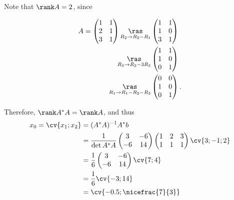\documentclass[11pt]{scrartcl}
\begin{document}
\begin{soln}
  Note that $\rank A = 2$, since

  \begin{align}
    A=    \begin{pmatrix}
    1 & 1\\
    2 & 1\\
    3 & 1
  \end{pmatrix} \underset{R_2\to R_2-R_1}{\ras}&
        \begin{pmatrix}
    1 & 1\\
    1 & 0\\
    3 & 1
  \end{pmatrix}\\
    \underset{R_3\to R_3-3R_2}{\ras}&
        \begin{pmatrix}
    1 & 1\\
    1 & 0\\
    0 & 1
  \end{pmatrix}\\
        \underset{R_1\to R_1-R_2-R_3}{\ras}&
        \begin{pmatrix}
    0 & 0\\
    1 & 0\\
    0 & 1
        \end{pmatrix}.
  \end{align}

  Therefore, $\rank A^{*}A = \rank A$, and thus
  \begin{align}
    x_0=\cv{x_1;x_2} &= (A^{*}A)^{-1}A^{*}b\\
                 &= \frac{1}{\det A^{*}A}
                   \begin{pmatrix}
                     3 & -6\\
                     -6 & 14
                   \end{pmatrix}
                          \begin{pmatrix}
                            1 & 2 & 3 \\
                            1 & 1 & 1
                          \end{pmatrix}\cv{3;-1;2}
    \\
                     &= \frac{1}{6}
                   \begin{pmatrix}
                     3 & -6\\
                     -6 & 14
                   \end{pmatrix}\cv{7;4}\\
                 &= \frac{1}{6}\cv{-3;14}\\
                 &=\cv{-0.5;\nicefrac{7}{3}}
  \end{align}


\end{soln}
\end{document}

